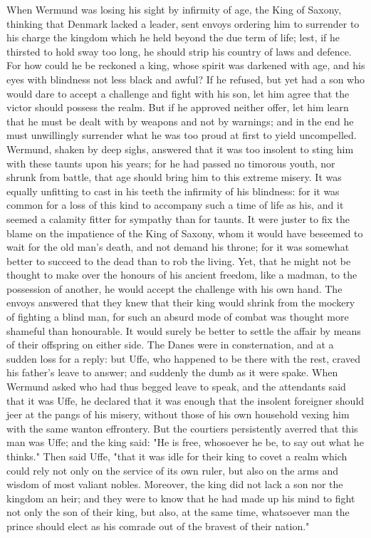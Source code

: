 \documentclass[10pt,a4paper]{report}
\begin{document}
When Wermund was losing his sight by infirmity of age, the King of Saxony, thinking that Denmark lacked a leader, sent envoys ordering him to surrender to his charge the kingdom which he held beyond the due term of life; lest, if he thirsted to hold sway too long, he should strip his country of laws and defence. For how could he be reckoned a king, whose spirit was darkened with age, and his eyes with blindness not less black and awful? If he refused, but yet had a son who would dare to accept a challenge and fight with his son, let him agree that the victor should possess the realm. But if he approved neither offer, let him learn that he must be dealt with by weapons and not by warnings; and in the end he must unwillingly surrender what he was too proud at first to yield uncompelled. Wermund, shaken by deep sighs, answered that it was too insolent to sting him with these taunts upon his years; for he had passed no timorous youth, nor shrunk from battle, that age should bring him to this extreme misery. It was equally unfitting to cast in his teeth the infirmity of his blindness: for it was common for a loss of this kind to accompany such a time of life as his, and it seemed a calamity fitter for sympathy than for taunts. It were juster to fix the blame on the impatience of the King of Saxony, whom it would have beseemed to wait for the old man's death, and not demand his throne; for it was somewhat better to succeed to the dead than to rob the living. Yet, that he might not be thought to make over the honours of his ancient freedom, like a madman, to the possession of another, he would accept the challenge with his own hand. The envoys answered that they knew that their king would shrink from the mockery of fighting a blind man, for such an absurd mode of combat was thought more shameful than honourable. It would surely be better to settle the affair by means of their offspring on either side. The Danes were in consternation, and at a sudden loss for a reply: but Uffe, who happened to be there with the rest, craved his father's leave to answer; and suddenly the dumb as it were spake. When Wermund asked who had thus begged leave to speak, and the attendants said that it was Uffe, he declared that it was enough that the insolent foreigner should jeer at the pangs of his misery, without those of his own household vexing him with the same wanton effrontery. But the courtiers persistently averred that this man was Uffe; and the king said: "He is free, whosoever he be, to say out what he thinks." Then said Uffe, "that it was idle for their king to covet a realm which could rely not only on the service of its own ruler, but also on the arms and wisdom of most valiant nobles. Moreover, the king did not lack a son nor the kingdom an heir; and they were to know that he had made up his mind to fight not only the son of their king, but also, at the same time, whatsoever man the prince should elect as his comrade out of the bravest of their nation."\\
\end{document}
